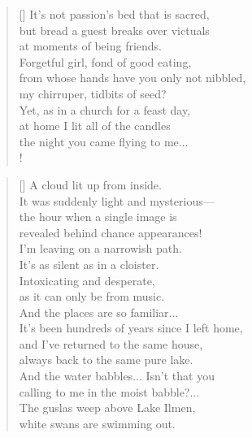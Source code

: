 \documentclass[]{article}
\newcommand{\poemauthorcenter}[1]{\nopagebreak{\centering\footnotesize\textsc{#1}\par}}
\begin{document}
\vspace*{0.075\textheight}
\settowidth{\versewidth}{It's not passion's bed that is sacred, }
\begin{verse}[\versewidth]
It's not passion's bed that is sacred,\\
but bread a guest breaks over victuals\\
at moments of being friends.\\
Forgetful girl, fond of good eating,\\
from whose hands have you only not nibbled,\\
my chirruper, tidbits of seed?\\
Yet, as in a church for a feast day,\\
at home I lit all of the candles\\
the night you came flying to me...\\!
\end{verse}
\poemauthorcenter{\textit{1923- 1924}}
\bigskip \bigskip

\settowidth{\versewidth}{revealed behind chance appearances!}
\begin{verse}[\versewidth]
A cloud lit up from inside.\\
It was suddenly light and mysterious—\\
the hour when a single image is\\
revealed behind chance appearances!\\
I'm leaving on a narrowish path.\\
It's as silent as in a cloister.\\
Intoxicating and desperate,\\
as it can only be from music.\\
And the places are so familiar...\\
It's been hundreds of years since I left home,\\
and I've returned to the same house,\\
always back to the same pure lake.\\
And the water babbles... Isn't that you\\
calling to me in the moist babble?...\\
The guslas weep above Lake Ilmen,\\
white swans are swimming out.\\
\end{verse}
\newpage 
\end{document}
